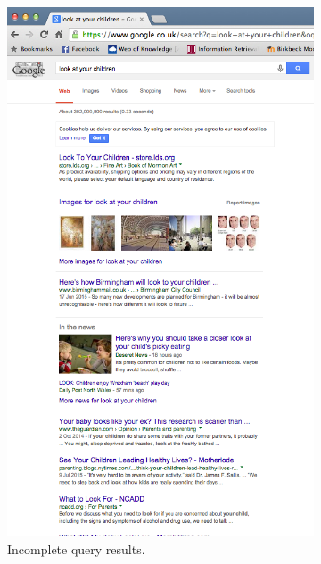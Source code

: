\documentclass[a4paper, 11pt]{article}
\begin{document}
\begin{enumerate}
{\begin{figure}[H]
\centering
\begin{subfigure}{.5\textwidth}
  \centering
  \includegraphics[width=.7\linewidth]{lookAtUrChildren}
  \caption{Incomplete query results.}
\end{subfigure}%
\begin{subfigure}{.5\textwidth}
  \centering

\end{subfigure}
\end{figure}}
\end{enumerate}
\end{document}
